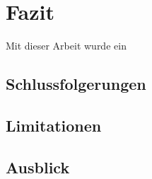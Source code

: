 \chapter{Fazit}
Mit dieser Arbeit wurde ein

\section{Schlussfolgerungen}

\section{Limitationen}

\section{Ausblick}

